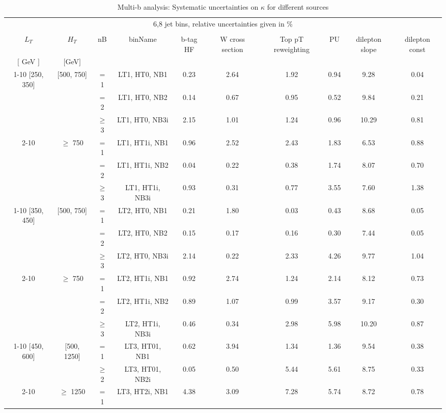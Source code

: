 \begin{table}[ht] 
 \tiny 
\caption{Multi-b analysis: Systematic uncertainties on $\kappa$ for different sources} 
\begin{center} 
\label{tab:sysTable} 
\begin{tabular}{|c | c | c | c | c | c | c | c | c | c | } 
\hline 
\multicolumn{10}{|c|}{6,8 jet bins, relative uncertainties given in \%} \\ 
\multicolumn{10}{|c|}{} \\ \hline 
$L_T$ & $H_T$ & nB & binName & b-tag HF & W cross section & Top pT reweighting & PU & dilepton slope & dilepton const  \\ 
 $[$ GeV $]$  &   $[$GeV$]$ & &  &  &  &  &  &  &   \\ \hline 
\cline{1-10} [250, 350] & [500, 750] & $=$ 1&LT1, HT0, NB1 & 0.23 & 2.64 & 1.92 & 0.94 & 9.28 & 0.04 \\ 
  &  & $=$ 2&LT1, HT0, NB2 & 0.14 & 0.67 & 0.95 & 0.52 & 9.84 & 0.21 \\ 
  &  & $\geq$ 3&LT1, HT0, NB3i & 2.15 & 1.01 & 1.24 & 0.96 & 10.29 & 0.81 \\ 
\cline{2-10}  & $\geq$ 750 & $=$ 1&LT1, HT1i, NB1 & 0.96 & 2.52 & 2.43 & 1.83 & 6.53 & 0.88 \\ 
  &  & $=$ 2&LT1, HT1i, NB2 & 0.04 & 0.22 & 0.38 & 1.74 & 8.07 & 0.70 \\ 
  &  & $\geq$ 3&LT1, HT1i, NB3i & 0.93 & 0.31 & 0.77 & 3.55 & 7.60 & 1.38 \\ 
\cline{1-10} [350, 450] & [500, 750] & $=$ 1&LT2, HT0, NB1 & 0.21 & 1.80 & 0.03 & 0.43 & 8.68 & 0.05 \\ 
  &  & $=$ 2&LT2, HT0, NB2 & 0.15 & 0.17 & 0.16 & 0.30 & 7.44 & 0.05 \\ 
  &  & $\geq$ 3&LT2, HT0, NB3i & 2.14 & 0.22 & 2.33 & 4.26 & 9.77 & 1.04 \\ 
\cline{2-10}  & $\geq$ 750 & $=$ 1&LT2, HT1i, NB1 & 0.92 & 2.74 & 1.24 & 2.14 & 8.12 & 0.73 \\ 
  &  & $=$ 2&LT2, HT1i, NB2 & 0.89 & 1.07 & 0.99 & 3.57 & 9.17 & 0.30 \\ 
  &  & $\geq$ 3&LT2, HT1i, NB3i & 0.46 & 0.34 & 2.98 & 5.98 & 10.20 & 0.87 \\ 
\cline{1-10} [450, 600] & [500, 1250] & $=$ 1&LT3, HT01, NB1 & 0.62 & 3.94 & 1.34 & 1.36 & 9.54 & 0.38 \\ 
  &  & $\geq$ 2&LT3, HT01, NB2i & 0.05 & 0.50 & 5.44 & 5.61 & 8.75 & 0.33 \\ 
\cline{2-10}  & $\geq$ 1250 & $=$ 1&LT3, HT2i, NB1 & 4.38 & 3.09 & 7.28 & 5.74 & 8.72 & 0.78 \\ 

\end{tabular}
\end{center}
\end{table}

